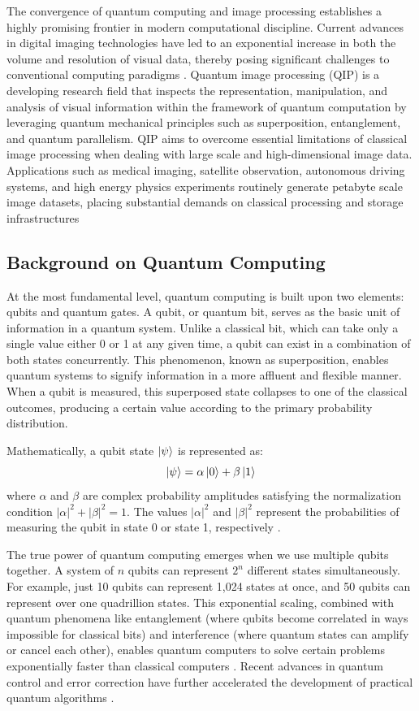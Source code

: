 \documentclass[pdflatex,sn-mathphys-num,Numbered]{sn-jnl}
\theoremstyle{thmstyleone}
\theoremstyle{thmstyletwo}
\theoremstyle{thmstylethree}
\begin{document}
The convergence of quantum computing and image processing establishes a highly promising frontier in modern computational discipline. Current advances in digital imaging technologies have led to an exponential increase in both the volume and resolution of visual data, thereby posing significant challenges to conventional computing paradigms \cite{bib1}. Quantum image processing (QIP) is a developing research field that inspects the representation, manipulation, and analysis of visual information within the framework of quantum computation by leveraging quantum mechanical principles such as superposition, entanglement, and quantum parallelism. QIP aims to overcome essential limitations of classical image processing when dealing with large scale and high-dimensional image data. Applications such as medical imaging, satellite observation, autonomous driving systems, and high energy physics experiments routinely generate petabyte scale image datasets, placing substantial demands on classical processing and storage infrastructures

\subsection{Background on Quantum Computing}

At the most fundamental level, quantum computing is built upon two elements: qubits and quantum gates. A qubit, or quantum bit, serves as the basic unit of information in a quantum system. Unlike a classical bit, which can take only a single value either 0 or 1 at any given time, a qubit can exist in a combination of both states concurrently. This phenomenon, known as superposition, enables quantum systems to signify information in a more affluent and flexible manner. When a qubit is measured, this superposed state collapses to one of the classical outcomes, producing a certain value according to the primary probability distribution.

Mathematically, a qubit state $\ket{\psi}$ is represented as:
\begin{equation}
\ket{\psi} = \alpha\ket{0} + \beta\ket{1}
\label{eq:qubit}
\end{equation}
where $\alpha$ and $\beta$ are complex probability amplitudes satisfying the normalization condition $|\alpha|^2 + |\beta|^2 = 1$. The values $|\alpha|^2$ and $|\beta|^2$ represent the probabilities of measuring the qubit in state 0 or state 1, respectively \cite{bib2}.

The true power of quantum computing emerges when we use multiple qubits together. A system of $n$ qubits can represent $2^n$ different states simultaneously. For example, just 10 qubits can represent 1,024 states at once, and 50 qubits can represent over one quadrillion states. This exponential scaling, combined with quantum phenomena like entanglement (where qubits become correlated in ways impossible for classical bits) and interference (where quantum states can amplify or cancel each other), enables quantum computers to solve certain problems exponentially faster than classical computers \cite{bib3,bib4}. Recent advances in quantum control and error correction have further accelerated the development of practical quantum algorithms \cite{bib5,bib6,bib7,bib8}.
\end{document}

